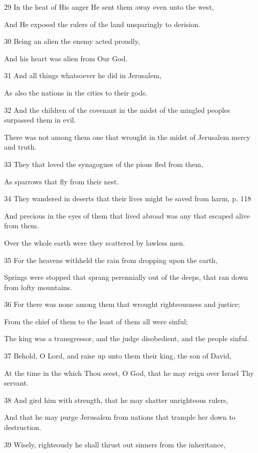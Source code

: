 \par 29 In the heat of His anger He sent them away even unto the west,
\par  And He exposed the rulers of the land unsparingly to derision.
\par 30 Being an alien the enemy acted proudly,
\par  And his heart was alien from Our God.
\par 31 And all things whatsoever he did in Jerusalem,
\par  As also the nations in the cities to their gods.
\par    
\par 32 And the children of the covenant in the midst of the mingled peoples surpassed them in evil.
\par  There was not among them one that wrought in the midst of Jerusalem mercy and truth.
\par 33 They that loved the synagogues of the pious fled from them,
\par  As sparrows that fly from their nest.
\par 34 They wandered in deserts that their lives might be saved from harm, p. 118
\par  And precious in the eyes of them that lived abroad was any that escaped alive from them.
\par  Over the whole earth were they scattered by lawless men.
\par 35 For the heavens withheld the rain from dropping upon the earth,
\par  Springs were stopped that sprang perennially out of the deeps, that ran down from lofty mountains.
\par 36 For there was none among them that wrought righteousness and justice;
\par  From the chief of them to the least of them all were sinful;
\par  The king was a transgressor, and the judge disobedient, and the people sinful.
\par 37 Behold, O Lord, and raise up unto them their king, the son of David,
\par  At the time in the which Thou seest, O God, that he may reign over Israel Thy servant.
\par 38 And gird him with strength, that he may shatter unrighteous rulers,
\par  And that he may purge Jerusalem from nations that trample her down to destruction.
\par 39 Wisely, righteously he shall thrust out sinners from the inheritance,
